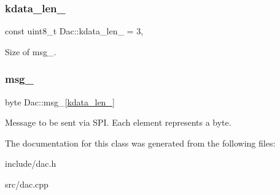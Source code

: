 \subsubsection{\texorpdfstring{kdata\+\_\+len\+\_\+}{kdata\_len\_}}
{\footnotesize\ttfamily const uint8\+\_\+t Dac\+::kdata\+\_\+len\+\_\+ = 3\hspace{0.3cm}{\ttfamily [static]}, {\ttfamily [protected]}}

Size of msg\+\_\+. \mbox{\label{classDac_a82d9c857af6ba19123b3f5d5187dce1d}} 
\subsubsection{\texorpdfstring{msg\+\_\+}{msg\_}}
{\footnotesize\ttfamily byte Dac\+::msg\+\_\+\mbox{[}\mbox{\hyperlink{classDac_af3de0bf669183e66ebf916f8c685fe6b}{kdata\+\_\+len\+\_\+}}\mbox{]}\hspace{0.3cm}{\ttfamily [protected]}}

Message to be sent via S\+PI. Each element represents a byte. 

The documentation for this class was generated from the following files\+:\begin{DoxyCompactItemize}
\item 
include/dac.\+h\item 
src/dac.\+cpp\end{DoxyCompactItemize}
